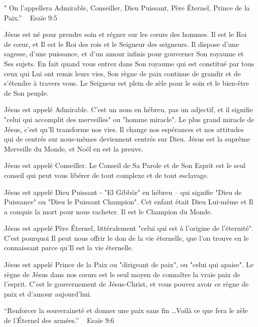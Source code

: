 
" On l’appellera Admirable, Conseiller, Dieu Puissant, Père Éternel, Prince de la Paix.”  ~ Esaïe 9:5

Jésus est né pour prendre soin et régner sur les cœurs des hommes. Il est le Roi de cœur, et Il est le Roi des rois et le Seigneur des seigneurs. Il dispose d'une sagesse, d'une puissance, et d'un amour infinis pour gouverner Son royaume et Ses sujets. En fait quand vous entrez dans Son royaume qui est constitué par tous ceux qui Lui ont remis leurs vies, Son règne de paix continue de grandir et de s'étendre à travers vous. Le Seigneur est plein de zèle pour le soin et le bien-être de Son peuple.

Jésus est appelé Admirable. C'est un nom en hébreu, pas un adjectif, et il signifie "celui qui accomplit des merveilles" ou "homme miracle". Le plus grand miracle de Jésus, c'est qu'Il transforme nos vies. Il change nos espérances et nos attitudes qui de centrés sur nous-mêmes deviennent centrés sur Dieu. Jésus est la suprême Merveille du Monde, et Noël en est la preuve.

Jésus est appelé Conseiller. Le Conseil de Sa Parole et de Son Esprit est le seul conseil qui peut vous libérer de tout complexe et de tout esclavage.

Jésus est appelé Dieu Puissant - "El Gibbôr" en hébreu – qui signifie "Dieu de Puissance" ou "Dieu le Puissant Champion". Cet enfant était Dieu Lui-même et Il a conquis la mort pour nous racheter. Il est le Champion du Monde.

Jésus est appelé Père Éternel, littéralement "celui qui est à l'origine de l'éternité". C'est pourquoi Il peut nous offrir le don de la vie éternelle, que l'on trouve en le connaissant parce qu'Il est la vie éternelle.



Jésus est appelé Prince de la Paix ou "dirigeant de paix", ou "celui qui apaise". Le règne de Jésus dans nos cœurs est le seul moyen de connaître la vraie paix de l'esprit. C'est le gouvernement de Jésus-Christ, et vous pouvez avoir ce règne de paix et d'amour aujourd'hui.

“Renforcer la souveraineté et donner une paix sans fin …Voilà ce que fera le zèle de l’Éternel des armées.”
                                                ~ Esaïe 9:6 






